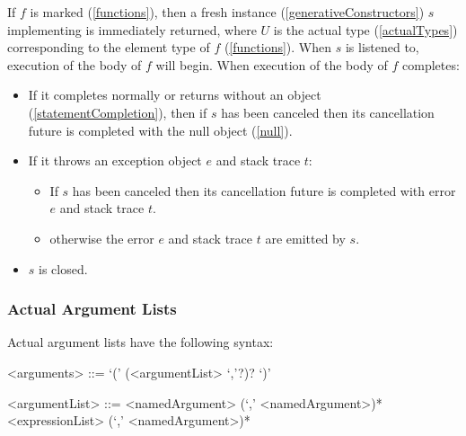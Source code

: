 \documentclass[makeidx]{article}
\begin{document}
{\LMHash{}%
If $f$ is marked \code{\ASYNC*} (\ref{functions}),
then a fresh instance (\ref{generativeConstructors}) $s$
implementing  is immediately returned,
where $U$ is the actual type
(\ref{actualTypes})
corresponding to the element type of $f$
(\ref{functions}).
When $s$ is listened to, execution of the body of $f$ will begin.
When execution of the body of $f$ completes:
\begin{itemize}
\item If it completes normally or returns without an object
  (\ref{statementCompletion}),
  then if $s$ has been canceled
  then its cancellation future is completed with the null object (\ref{null}).
\item If it throws an exception object $e$ and stack trace $t$:
  \begin{itemize}
  \item If $s$ has been canceled then its cancellation future is completed
    with error $e$ and stack trace $t$.
  \item otherwise the error $e$ and stack trace $t$ are emitted by $s$.
  \end{itemize}
\item $s$ is closed.
\end{itemize}



\subsubsection{Actual Argument Lists}

\LMHash{}%
Actual argument lists have the following syntax:

\begin{grammar}
<arguments> ::= `(' (<argumentList> `,'?)? `)'

<argumentList> ::= <namedArgument> (`,' <namedArgument>)*
  \alt <expressionList> (`,' <namedArgument>)*


\end{grammar}}
\end{document}

